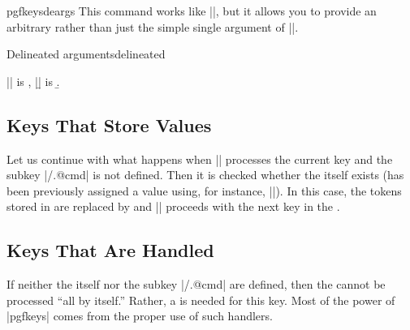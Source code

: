 
\begin{docCommand}{pgfkeysdeargs}{}{}
  This command works like |\pgfkeysdef|, but it allows you to provide
  an arbitrary  rather than just the simple
  single argument of |\pgfkeysdef|. 
\end{docCommand}
\begin{texexample}{Delineated arguments}{delineated}{}

|\a| is \a, |\b| is \b.
\end{texexample}




\subsection{Keys That Store Values}

Let us continue with what happens when |\pgfkeys| processes the
current key and  the subkey |/.@cmd| is not defined. Then
it is checked whether the  itself exists (has been
previously assigned a value using, for instance,
|\pgfkeyssetvalue|). In this case, the tokens stored in  are
replaced by  and |\pgfkeys| proceeds with the next key in
the . 


\subsection{Keys That Are Handled}
\label{section-key-handlers}

If neither the  itself nor the subkey |/.@cmd| are
defined, then the  cannot be processed ``all by itself.''
Rather, a  is needed for this key. Most of the power of
|pgfkeys| comes from the proper use of such handlers.

